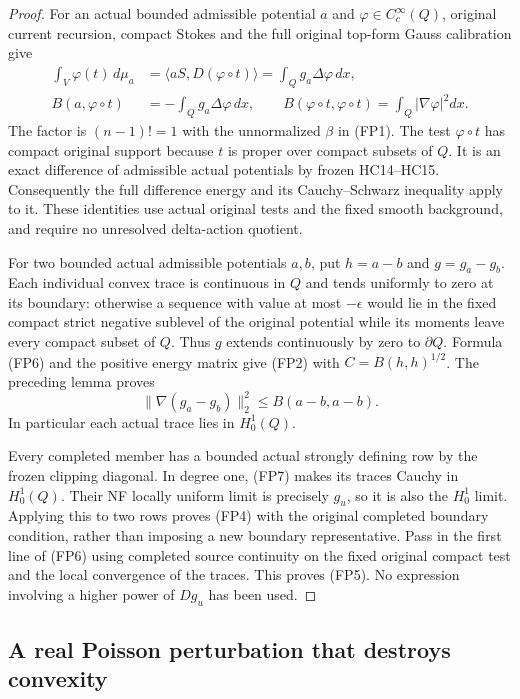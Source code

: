 \begin{proof}
For an actual bounded admissible potential $a$ and
$\varphi\in C_c^\infty(Q)$, original current recursion, compact
Stokes and the full original top-form Gauss calibration give
\[
 \begin{split}
 \int_V\varphi(t)\,d\mu_a
  &=\langle aS,D(\varphi\circ t)\rangle
    =\int_Qg_a\Delta\varphi\,dx,\\
 B(a,\varphi\circ t)&=-\int_Qg_a\Delta\varphi\,dx,\qquad
 B(\varphi\circ t,\varphi\circ t)
                         =\int_Q|\nabla\varphi|^2dx.
 \end{split}
 \tag{FP6}
\]
The factor is $(n-1)!=1$ with the unnormalized $\beta$ in (FP1).
The test $\varphi\circ t$ has compact original support because
$t$ is proper over compact subsets of $Q$. It is an exact difference
of admissible actual potentials by frozen HC14--HC15. Consequently
the full difference energy and its Cauchy--Schwarz inequality apply
to it. These identities use actual original tests and the fixed
smooth background, and require no unresolved delta-action quotient.

For two bounded actual admissible potentials $a,b$, put
$h=a-b$ and $g=g_a-g_b$. Each individual convex trace is continuous
in $Q$ and tends uniformly to zero at its boundary: otherwise a
sequence with value at most $-\epsilon$ would lie in the fixed
compact strict negative sublevel of the original potential while
its moments leave every compact subset of $Q$. Thus $g$ extends
continuously by zero to $\partial Q$. Formula (FP6) and the
positive energy matrix give (FP2) with $C=B(h,h)^{1/2}$.
The preceding lemma proves
\[
                 \|\nabla(g_a-g_b)\|_2^2\le B(a-b,a-b).
 \tag{FP7}
\]
In particular each actual trace lies in $H_0^1(Q)$.

Every completed member has a bounded actual strongly defining
row by the frozen clipping diagonal. In degree one, (FP7) makes
its traces Cauchy in $H_0^1(Q)$. Their NF locally uniform limit
is precisely $g_u$, so it is also the $H_0^1$ limit. Applying
this to two rows proves (FP4) with the original completed boundary
condition, rather than imposing a new boundary representative.
Pass in the first line of (FP6) using completed source continuity
on the fixed original compact test and the local convergence of
the traces. This proves (FP5). No expression involving a higher
power of $Dg_u$ has been used.
\end{proof}

\subsection{A real Poisson perturbation that destroys convexity}

